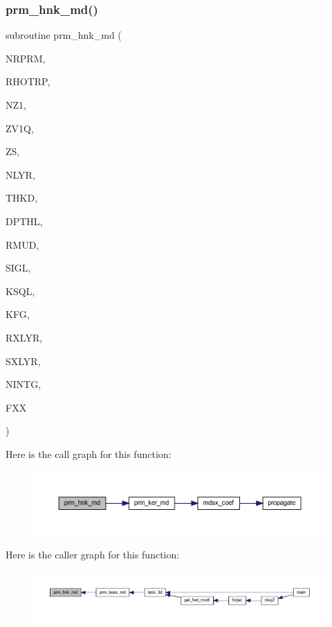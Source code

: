 \subsubsection{\texorpdfstring{prm\+\_\+hnk\+\_\+md()}{prm\_hnk\_md()}}
{\footnotesize\ttfamily subroutine prm\+\_\+hnk\+\_\+md (\begin{DoxyParamCaption}\item[{integer}]{N\+R\+P\+RM,  }\item[{real, dimension(nrprm)}]{R\+H\+O\+T\+RP,  }\item[{integer}]{N\+Z1,  }\item[{real(kind=ql), dimension(nz1)}]{Z\+V1Q,  }\item[{real(kind=ql)}]{ZS,  }\item[{integer}]{N\+L\+YR,  }\item[{real(kind=ql), dimension (nlyr)}]{T\+H\+KD,  }\item[{real(kind=ql), dimension (nlyr)}]{D\+P\+T\+HL,  }\item[{real(kind=ql), dimension(0\+:nlyr)}]{R\+M\+UD,  }\item[{complex(kind=ql), dimension (nlyr)}]{S\+I\+GL,  }\item[{complex(kind=ql), dimension (nlyr)}]{K\+S\+QL,  }\item[{integer}]{K\+FG,  }\item[{integer}]{R\+X\+L\+YR,  }\item[{integer}]{S\+X\+L\+YR,  }\item[{integer}]{N\+I\+N\+TG,  }\item[{complex(kind=ql), dimension(nrprm,5,nz1)}]{F\+XX }\end{DoxyParamCaption})}

Here is the call graph for this function\+:\nopagebreak
\begin{figure}[H]
\begin{center}
\leavevmode
\includegraphics[width=350pt]{Leroi_8f90_a9740ab7613ac873fc595cc92e6d5fbaf_cgraph}
\end{center}
\end{figure}
Here is the caller graph for this function\+:\nopagebreak
\begin{figure}[H]
\begin{center}
\leavevmode
\includegraphics[width=350pt]{Leroi_8f90_a9740ab7613ac873fc595cc92e6d5fbaf_icgraph}
\end{center}
\end{figure}
\mbox{\label{Leroi_8f90_a89b4321e05fd2190aba745c6eec86645}} 
